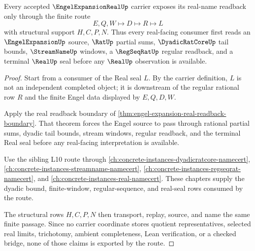 \begin{theorem}
\label{thm:engel-expansion-real-regular-cauchy-route}
Every accepted $\EngelExpansionRealUp$ carrier exposes its real-name readback only through the finite route
$$
E,Q,W \longmapsto D \longmapsto R \longmapsto L
$$
with structural support $H,C,P,N$. Thus every real-facing consumer first reads an $\EngelExpansionUp$ source, $\RatUp$ partial sums, $\DyadicRatCoreUp$ tail bounds, $\StreamNameUp$ windows, a $\RegSeqRatUp$ regular readback, and a terminal $\RealUp$ seal before any $\RealUp$ observation is available.
\end{theorem}
\begin{proof}
Start from a consumer of the Real seal $L$. By the carrier definition, $L$ is not an independent completed object; it is downstream of the regular rational row $R$ and the finite Engel data displayed by $E,Q,D,W$.

Apply the real readback boundary of \autoref{thm:engel-expansion-real-readback-boundary}. That theorem forces the Engel source to pass through rational partial sums, dyadic tail bounds, stream windows, regular readback, and the terminal Real seal before any real-facing interpretation is available.

Use the sibling L10 route through \autoref{ch:concrete-instances-dyadicratcore-namecert}, \autoref{ch:concrete-instances-streamname-namecert}, \autoref{ch:concrete-instances-regseqrat-namecert}, and \autoref{ch:concrete-instances-real-namecert}. These chapters supply the dyadic bound, finite-window, regular-sequence, and real-seal rows consumed by the route.

The structural rows $H,C,P,N$ then transport, replay, source, and name the same finite passage. Since no carrier coordinate stores quotient representatives, selected real limits, trichotomy, ambient completeness, Lean verification, or a checked bridge, none of those claims is exported by the route.
\end{proof}


